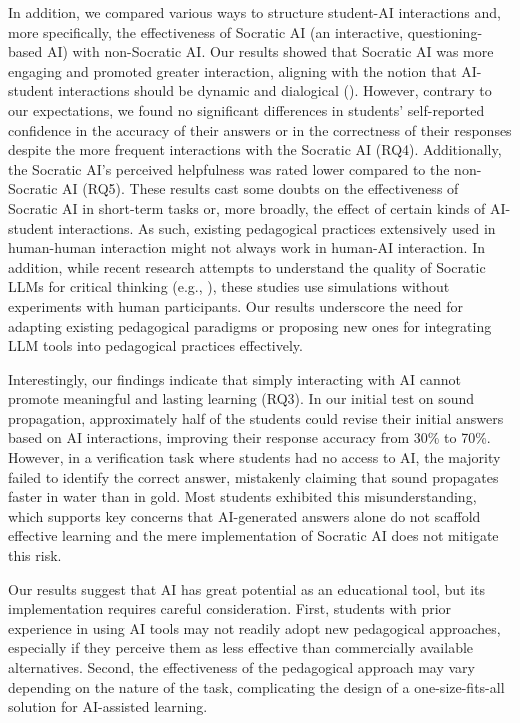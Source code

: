 \documentclass[
  11pt,
]{article}
\begin{document}
In addition, we compared various ways to structure student-AI interactions and, more specifically, the effectiveness of Socratic AI (an interactive, questioning-based AI) with non-Socratic AI. Our results showed that Socratic AI was more engaging and promoted greater interaction, aligning with the notion that AI-student interactions should be dynamic and dialogical (). However, contrary to our expectations, we found no significant differences in students' self-reported confidence in the accuracy of their answers or in the correctness of their responses despite the more frequent interactions with the Socratic AI (RQ4). Additionally, the Socratic AI's perceived helpfulness was rated lower compared to the non-Socratic AI (RQ5). These results cast some doubts on the effectiveness of Socratic AI in short-term tasks or, more broadly, the effect of certain kinds of AI-student interactions. As such, existing pedagogical practices extensively used in human-human interaction might not always work in human-AI interaction. In addition, while recent research attempts to understand the quality of Socratic LLMs for critical thinking (e.g., ), these studies use simulations without experiments with human participants. Our results underscore the need for adapting existing pedagogical paradigms or proposing new ones for integrating LLM tools into pedagogical practices effectively.

Interestingly, our findings indicate that simply interacting with AI cannot promote meaningful and lasting learning (RQ3). In our initial test on sound propagation, approximately half of the students could revise their initial answers based on AI interactions, improving their response accuracy from 30\% to 70\%. However, in a verification task where students had no access to AI, the majority failed to identify the correct answer, mistakenly claiming that sound propagates faster in water than in gold. Most students exhibited this misunderstanding, which supports key concerns that AI-generated answers alone do not scaffold effective learning and the mere implementation of Socratic AI does not mitigate this risk.

Our results suggest that AI has great potential as an educational tool, but its implementation requires careful consideration. First, students with prior experience in using AI tools may not readily adopt new pedagogical approaches, especially if they perceive them as less effective than commercially available alternatives. Second, the effectiveness of the pedagogical approach may vary depending on the nature of the task, complicating the design of a one-size-fits-all solution for AI-assisted learning.
\end{document}
